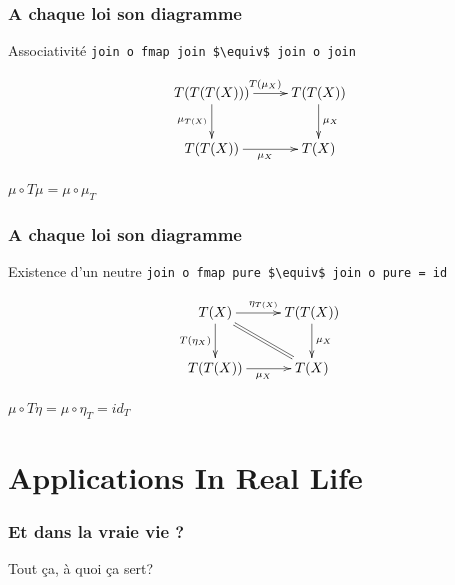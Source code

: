 \documentclass{beamer}
\begin{document}
\begin{frame}
\frametitle{A chaque loi son diagramme}
\begin{alertblock}{Associativité}
\verb!join o fmap join $\equiv$ join o join!
\end{alertblock}

\begin{block}{}

\[
\xymatrix{
T(T(T(X))) \ar[r]^{T(\mu_X)} \ar[d]_{\mu_{T(X)}} & T(T(X)) \ar[d]^{\mu_X} \\
T(T(X)) \ar[r]_{\mu_X} & T(X) \\
}
\]
\end{block}

\begin{block}{}
\begin{center}
$\mu \circ T\mu = \mu \circ \mu_T$
\end{center}
\end{block}

\end{frame}

\begin{frame}
\frametitle{A chaque loi son diagramme}
\begin{alertblock}{Existence d'un neutre}
\verb!join o fmap pure $\equiv$ join o pure = id!
\end{alertblock}

\begin{block}{}
\[
\xymatrix{
T(X) \ar[r]^{\eta_{T(X)}} \ar[d]_{T(\eta_X)}  \ar@{=}[dr] & T(T(X)) \ar[d]^{\mu_X} \\
T(T(X)) \ar[r]_{\mu_X} & T(X) \\
}
\]
\end{block}

\begin{block}{}
\begin{center}
$\mu \circ T \eta = \mu \circ \eta_T = id_T$
\end{center}
\end{block}

\end{frame}

\section{Applications In Real Life}
\begin{frame}
  \frametitle{Et dans la vraie vie ?}
  \begin{alertblock}{}
  \begin{center}
    Tout ça, à quoi ça sert?
  \end{center}
  \end{alertblock}
\end{frame}
\end{document}
